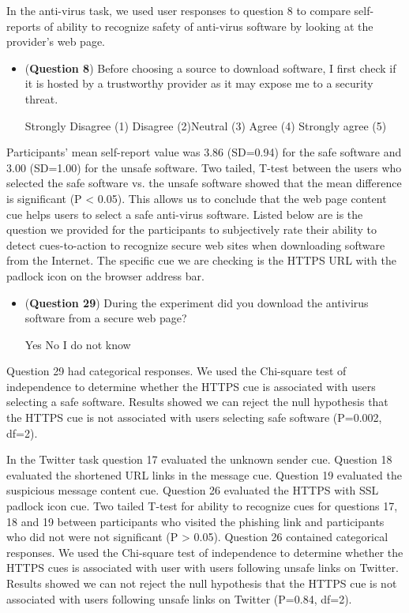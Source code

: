 In the anti-virus task, we used user responses to question 8 to compare self-reports of ability to recognize safety of anti-virus software by looking at the provider's web page.
\begin{itemize}
\item (\textbf{Question 8}) Before choosing a source to download software, I first check if it is hosted by a trustworthy provider as it may expose me to a security threat.
\par Strongly Disagree (1) \hspace{0.5cm} Disagree (2)\hspace{0.5cm}Neutral (3)\hspace{0.5cm} Agree (4)\hspace{0.5cm} Strongly agree (5)
\end{itemize}
Participants' mean self-report value was 3.86 (SD=0.94) for the safe software and 3.00 (SD=1.00) for the unsafe software. 
Two tailed, T-test between the users who selected the safe software vs. the unsafe software showed that the mean difference is significant (P < 0.05). This allows us to conclude that the web page content cue helps users to select a safe anti-virus software. 
Listed below are is the question we provided for the participants to  subjectively rate their ability to detect cues-to-action to recognize secure web sites when downloading software from the Internet.
The specific cue we are checking is the HTTPS URL with the padlock icon on the browser address bar.
\begin{itemize}
\item (\textbf{Question 29}) During the experiment did you download the antivirus software from a secure web page?
\par Yes \hspace{1cm} No \hspace{1cm} I do not know
\end{itemize}
Question 29 had categorical responses. 
We used the Chi-square test of independence to determine whether the HTTPS cue is associated with users selecting a safe software. 
Results showed we can reject the null hypothesis that the HTTPS cue is not associated with users selecting safe software (P=0.002, df=2).

In the Twitter task question 17 evaluated the unknown sender cue. Question 18 evaluated the shortened URL links in the message cue. Question 19 evaluated the suspicious message content cue. Question 26 evaluated the HTTPS with SSL padlock icon cue. Two tailed T-test for ability to recognize cues for questions 17, 18 and 19 between participants who visited the phishing link and participants who did not were not significant (P > 0.05). Question 26 contained categorical responses. We used the Chi-square test of independence to determine whether the HTTPS cues is associated with user with users following unsafe links on Twitter. Results showed we can not reject the null hypothesis that the HTTPS cue is not associated with users following unsafe links on Twitter (P=0.84, df=2).

